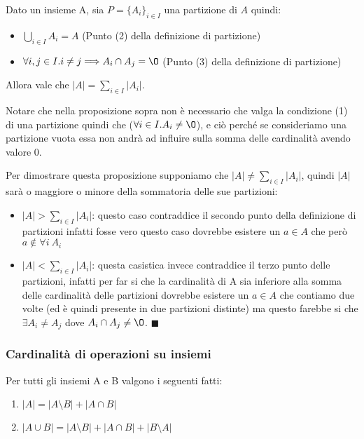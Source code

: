 \begin{lemma}[Lemma-x]\label{lemma-x}
Dato un insieme A, sia $P = \{A_i\}_{i \in I}$ una partizione di $A$ quindi:
\begin{itemize}
    \item $\bigcup\limits_{i \in I}A_i = A$ (Punto (2) della definizione di partizione)
    \item $\forall i,j \in I . i\neq j \Longrightarrow A_i \cap A_j = \O$ (Punto (3) della definizione di partizione)
\end{itemize}
Allora vale che $|A| = \sum\limits_{i\in I}|A_i|$.
\end{lemma}
\begin{note}
Notare che nella proposizione sopra non è necessario che valga la condizione (1) di una partizione quindi che ($\forall i \in I . A_i \neq \O$), e ciò perché se consideriamo una partizione vuota essa non andrà ad influire sulla somma delle cardinalità avendo valore 0. 
\end{note}
\begin{demostration}
Per dimostrare questa proposizione supponiamo che $|A| \neq \sum\limits_{i\in I}|A_i|$, quindi $|A|$ sarà o maggiore o minore della sommatoria delle sue partizioni:
\begin{itemize}
    \item $|A| > \sum\limits_{i\in I}|A_i|$: questo caso contraddice il secondo punto della definizione di partizioni infatti fosse vero questo caso dovrebbe esistere un $a \in A$ che però $a \notin \forall i \: A_i$
    \item $|A| < \sum\limits_{i\in I}|A_i|$: questa casistica invece contraddice il terzo punto delle partizioni, infatti per far si che la cardinalità di A sia inferiore alla somma delle cardinalità delle partizioni dovrebbe esistere un $a \in A$ che contiamo due volte (ed è quindi presente in due partizioni distinte) ma questo farebbe si che $\exists A_i \neq A_j$ dove $A_i \cap A_j \neq \O$. $\blacksquare$
\end{itemize}
\end{demostration}

\subsubsection{Cardinalità di operazioni su insiemi}
\begin{proposition}
Per tutti gli insiemi A e B valgono i seguenti fatti:
\begin{enumerate}
    \item $|A| = |A\setminus B| + |A\cap B|$
    \item $|A \cup B| = |A\setminus B| + |A \cap B| + |B \setminus A|$
\end{enumerate}
\end{proposition}

